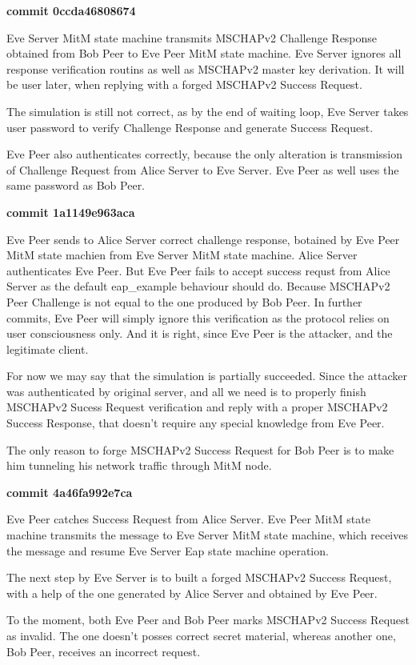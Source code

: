 \documentclass{extarticle}
\begin{document}
\textbf{commit 0ccda46808674}

Eve Server MitM state machine transmits MSCHAPv2 Challenge
Response obtained from Bob Peer to Eve Peer MitM state machine.
Eve Server ignores
all response verification routins as well as MSCHAPv2 master
key derivation. It will be user later, when replying with a forged
MSCHAPv2 Success Request.

The simulation is still not correct,
as by the end of  waiting loop, Eve Server takes user password
to verify Challenge Response and generate Success Request.

Eve Peer also authenticates correctly, because the only alteration
is transmission of Challenge Request from Alice Server to Eve Server.
Eve Peer as well uses the same password as Bob Peer.

\textbf{commit 1a1149e963aca}

Eve Peer sends to Alice Server correct challenge response,
botained by Eve Peer MitM state machien from Eve Server MitM state machine.
Alice Server authenticates Eve Peer.
But Eve Peer fails to accept success requst from Alice Server
as the default eap\_example behaviour should do.
Because MSCHAPv2 Peer Challenge is not equal to the one produced by Bob Peer.
In further commits, Eve Peer will simply ignore this verification
as the protocol relies on user consciousness only.
And it is right, since Eve Peer is the attacker,
and the legitimate client.

For now we may say that the simulation is partially succeeded.
Since the attacker was authenticated by original server,
and all we need is to properly finish MSCHAPv2 Sucess Request verification
and reply with a proper MSCHAPv2 Success Response, that doesn't
require any special knowledge from Eve Peer.

The only reason to forge MSCHAPv2 Success Request for Bob Peer
is to make him tunneling his network traffic through MitM node.

\textbf{commit 4a46fa992e7ca}

Eve Peer catches Success Request from Alice Server.
Eve Peer MitM state machine transmits the message to Eve Server MitM state machine,
which receives the message and resume Eve Server Eap state machine operation.

The next step by Eve Server is to built a forged MSCHAPv2 Success Request,
with a help of the one generated by Alice Server and obtained by Eve Peer.

To the moment, both Eve Peer and Bob Peer marks MSCHAPv2 Success Request
as invalid. The one doesn't posses correct secret material,
whereas another one, Bob Peer, receives an incorrect request.
\end{document}
